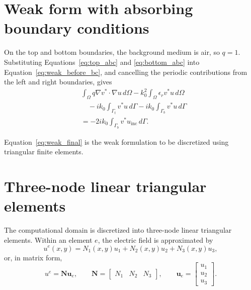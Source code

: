 \documentclass{article}
\begin{document}
\section{Weak form with absorbing boundary conditions}

On the top and bottom boundaries, the background medium is air, so
$q=1$. Substituting Equations~\eqref{eq:top_abc} and
\eqref{eq:bottom_abc} into Equation~\eqref{eq:weak_before_bc}, and
cancelling the periodic contributions from the left and right
boundaries, gives
\begin{align}
    &\int_\Omega q\nabla v^*\cdot\nabla u\,d\Omega
    -k_0^2\int_\Omega\epsilon_rv^*u\,d\Omega
    \nonumber\\
    &\quad
    -ik_0\int_{\Gamma_t}v^*u\,d\Gamma
    -ik_0\int_{\Gamma_b}v^*u\,d\Gamma
    \nonumber\\
    &=
    -2ik_0\int_{\Gamma_b}v^*u_{\mathrm{inc}}\,d\Gamma.
    \label{eq:weak_final}
\end{align}

Equation~\eqref{eq:weak_final} is the weak formulation to be discretized
using triangular finite elements.

\section{Three-node linear triangular elements}

The computational domain is discretized into three-node linear
triangular elements. Within an element $e$, the electric field is
approximated by
\begin{equation}
    u^e(x,y)=N_1(x,y)u_1+N_2(x,y)u_2+N_3(x,y)u_3,
\end{equation}
or, in matrix form,
\begin{equation}
    u^e=\mathbf{N}\mathbf{u}_e,
    \qquad
    \mathbf{N}=
    \begin{bmatrix}N_1&N_2&N_3\end{bmatrix},
    \qquad
    \mathbf{u}_e=
    \begin{bmatrix}u_1\\u_2\\u_3\end{bmatrix}.
\end{equation}
\end{document}

